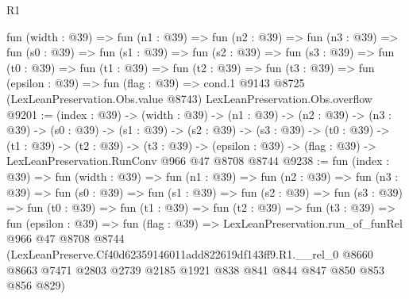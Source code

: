 \begin{lexlean}{R1}
\begin{coremodule}
  fun (width : @39) =>
  fun (n1 : @39) =>
  fun (n2 : @39) =>
  fun (n3 : @39) =>
  fun (s0 : @39) =>
  fun (s1 : @39) =>
  fun (s2 : @39) =>
  fun (s3 : @39) =>
  fun (t0 : @39) =>
  fun (t1 : @39) =>
  fun (t2 : @39) =>
  fun (t3 : @39) =>
  fun (epsilon : @39) =>
  fun (flag : @39) =>
  cond.{1} @9143 @8725 (LexLeanPreservation.Obs.value @8743) LexLeanPreservation.Obs.overflow
@9201 := (index : @39) ->
  (width : @39) ->
  (n1 : @39) ->
  (n2 : @39) ->
  (n3 : @39) ->
  (s0 : @39) ->
  (s1 : @39) ->
  (s2 : @39) ->
  (s3 : @39) ->
  (t0 : @39) ->
  (t1 : @39) ->
  (t2 : @39) ->
  (t3 : @39) -> (epsilon : @39) -> (flag : @39) -> LexLeanPreservation.RunConv @966 @47 @8708 @8744
@9238 := fun (index : @39) =>
  fun (width : @39) =>
  fun (n1 : @39) =>
  fun (n2 : @39) =>
  fun (n3 : @39) =>
  fun (s0 : @39) =>
  fun (s1 : @39) =>
  fun (s2 : @39) =>
  fun (s3 : @39) =>
  fun (t0 : @39) =>
  fun (t1 : @39) =>
  fun (t2 : @39) =>
  fun (t3 : @39) =>
  fun (epsilon : @39) =>
  fun (flag : @39) =>
  LexLeanPreservation.run_of_funRel
    @966
    @47
    @8708
    @8744
    (LexLeanPreserve.Cf40d62359146011add822619df143ff9.R1.__rel_0
      @8660
      @8663
      @7471
      @2803
      @2739
      @2185
      @1921
      @838
      @841
      @844
      @847
      @850
      @853
      @856
      @829)
\end{coremodule}
\end{lexlean}
